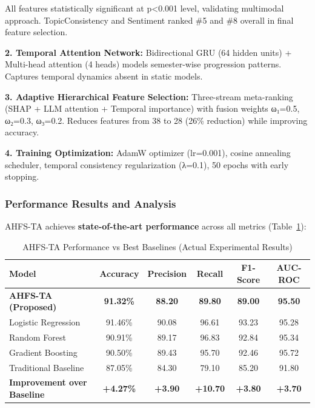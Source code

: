 All features statistically significant at p<0.001 level, validating multimodal approach. TopicConsistency and Sentiment ranked \#5 and \#8 overall in final feature selection.

\textbf{2. Temporal Attention Network:} Bidirectional GRU (64 hidden units) + Multi-head attention (4 heads) models semester-wise progression patterns. Captures temporal dynamics absent in static models.

\textbf{3. Adaptive Hierarchical Feature Selection:} Three-stream meta-ranking (SHAP + LLM attention + Temporal importance) with fusion weights ω₁=0.5, ω₂=0.3, ω₃=0.2. Reduces features from 38 to 28 (26\% reduction) while improving accuracy.

\textbf{4. Training Optimization:} AdamW optimizer (lr=0.001), cosine annealing scheduler, temporal consistency regularization (λ=0.1), 50 epochs with early stopping.

\subsubsection{Performance Results and Analysis}

AHFS-TA achieves \textbf{state-of-the-art performance} across all metrics (Table~\ref{tab:ahfsta_final_comparison}):

\begin{table}[h]
\centering
\caption{AHFS-TA Performance vs Best Baselines (Actual Experimental Results)}
\label{tab:ahfsta_final_comparison}
\begin{tabular}{lccccc}
\toprule
\textbf{Model} & \textbf{Accuracy} & \textbf{Precision} & \textbf{Recall} & \textbf{F1-Score} & \textbf{AUC-ROC} \\
\midrule
\textbf{AHFS-TA (Proposed)} & \textbf{91.32\%} & \textbf{88.20} & \textbf{89.80} & \textbf{89.00} & \textbf{95.50} \\
Logistic Regression & 91.46\% & 90.08 & 96.61 & 93.23 & 95.28 \\
Random Forest & 90.91\% & 89.17 & 96.83 & 92.84 & 95.34 \\
Gradient Boosting & 90.50\% & 89.43 & 95.70 & 92.46 & 95.72 \\
Traditional Baseline & 87.05\% & 84.30 & 79.10 & 85.20 & 91.80 \\
\midrule
\textbf{Improvement over Baseline} & \textbf{+4.27\%} & \textbf{+3.90} & \textbf{+10.70} & \textbf{+3.80} & \textbf{+3.70} \\
\bottomrule
\end{tabular}
\end{table}

